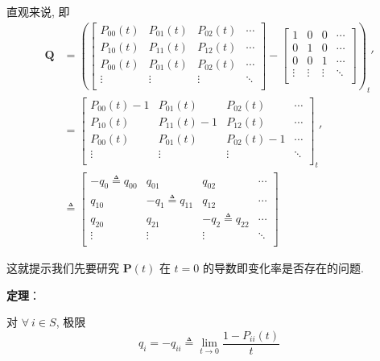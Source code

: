 \documentclass[openany]{ctexbook}
\theoremstyle{kaiti}
\theoremstyle{normal}
\begin{document}
直观来说, 即
\begin{equation}
  \begin{aligned}
    \bm{Q}
    &=
    \left(
      \begin{bmatrix}
        P_{00}(t) & P_{01}(t) & P_{02}(t) & \cdots \\
        P_{10}(t) & P_{11}(t) & P_{12}(t) & \cdots \\
        P_{00}(t) & P_{01}(t) & P_{02}(t) & \cdots \\
        \vdots & \vdots & \vdots & \ddots \\
      \end{bmatrix}
      -
      \begin{bmatrix}
        1 & 0 & 0 & \cdots \\
        0 & 1 & 0 & \cdots \\
        0 & 0 & 1 & \cdots \\
        \vdots & \vdots & \vdots & \ddots \\
      \end{bmatrix}
    \right)_t'\\
    &=
    \begin{bmatrix}
        P_{00}(t)-1 & P_{01}(t) & P_{02}(t) & \cdots \\
        P_{10}(t) & P_{11}(t)-1 & P_{12}(t) & \cdots \\
        P_{00}(t) & P_{01}(t) & P_{02}(t)-1 & \cdots \\
        \vdots & \vdots & \vdots & \ddots \\
      \end{bmatrix}_t'\\
    &\triangleq
    \begin{bmatrix}
        -q_0\triangleq q_{00} & q_{01} & q_{02} & \cdots \\
        q_{10} & -q_1\triangleq q_{11} & q_{12} & \cdots \\
        q_{20} & q_{21} & -q_2\triangleq q_{22} & \cdots \\
        \vdots & \vdots & \vdots & \ddots \\
    \end{bmatrix}
  \end{aligned}
\end{equation}

这就提示我们先要研究 $\bm{P}(t)$ 在 $t=0$ 的导数即变化率是否存在的问题.

\textbf{定理}：

对 $\forall~i\in S$, 极限
\begin{equation}
  q_i=-q_{ii}\triangleq\lim_{t\to0}\frac{1-P_{ii}(t)}{t}
\end{equation}
\end{document}
